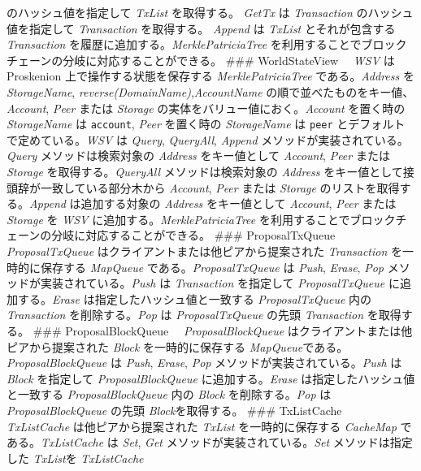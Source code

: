 のハッシュ値を指定して \emph{TxList} を取得する。 \emph{GetTx} は
\emph{Transaction} のハッシュ値を指定して \emph{Transaction}
を取得する。 \emph{Append} は \emph{TxList} とそれが包含する
\emph{Transaction} を履歴に追加する。\emph{MerklePatriciaTree}
を利用することでブロックチェーンの分岐に対応することができる。 \#\#\#
WorldStateView 　\emph{WSV} は Proskenion 上で操作する状態を保存する
\emph{MerklePatriciaTree} である。\emph{Address} を \emph{StorageName},
\emph{reverse(DomainName)},\emph{AccountName}
の順で並べたものをキー値、\emph{Account}, \emph{Peer} または
\emph{Storage} の実体をバリュー値におく。\emph{Account} を置く時の
\emph{StorageName} は \texttt{account}, \emph{Peer} を置く時の
\emph{StorageName} は \texttt{peer} とデフォルトで定めている。\emph{WSV}
は \emph{Query}, \emph{QueryAll}, \emph{Append}
メソッドが実装されている。\emph{Query} メソッドは検索対象の
\emph{Address} をキー値として \emph{Account}, \emph{Peer} または
\emph{Storage} を取得する。\emph{QueryAll} メソッドは検索対象の
\emph{Address} をキー値として接頭辞が一致している部分木から
\emph{Account}, \emph{Peer} または \emph{Storage}
のリストを取得する。\emph{Append} は追加する対象の \emph{Address}
をキー値として \emph{Account}, \emph{Peer} または \emph{Storage} を
\emph{WSV} に追加する。\emph{MerklePatriciaTree}
を利用することでブロックチェーンの分岐に対応することができる。 \#\#\#
ProposalTxQueue 　\emph{ProposalTxQueue}
はクライアントまたは他ピアから提案された \emph{Transaction}
を一時的に保存する \emph{MapQueue} である。\emph{ProposalTxQueue} は
\emph{Push}, \emph{Erase}, \emph{Pop}
メソッドが実装されている。\emph{Push} は \emph{Transaction} を指定して
\emph{ProposalTxQueue} に追加する。\emph{Erase}
は指定したハッシュ値と一致する \emph{ProposalTxQueue} 内の
\emph{Transaction} を削除する。\emph{Pop} は \emph{ProposalTxQueue}
の先頭 \emph{Transaction} を取得する。 \#\#\# ProposalBlockQueue
　\emph{ProposalBlockQueue} はクライアントまたは他ピアから提案された
\emph{Block} を一時的に保存する
\emph{MapQueue}である。\emph{ProposalBlockQueue} は \emph{Push},
\emph{Erase}, \emph{Pop} メソッドが実装されている。\emph{Push} は
\emph{Block} を指定して \emph{ProposalBlockQueue}
に追加する。\emph{Erase} は指定したハッシュ値と一致する
\emph{ProposalBlockQueue} 内の \emph{Block} を削除する。\emph{Pop} は
\emph{ProposalBlockQueue} の先頭 \emph{Block}を取得する。 \#\#\#
TxListCache 　\emph{TxListCache} は他ピアから提案された \emph{TxList}
を一時的に保存する \emph{CacheMap} である。\emph{TxListCache} は
\emph{Set}, \emph{Get} メソッドが実装されている。\emph{Set}
メソッドは指定した \emph{TxList}を \emph{TxListCache}
